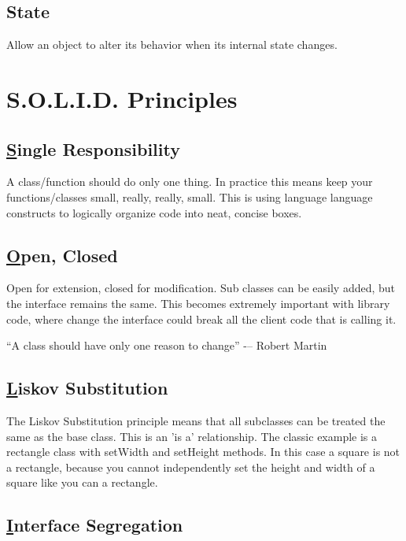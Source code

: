 \documentclass{article}
\begin{document}
\subsection{State}

\begin{displayquote}
Allow an object to alter its behavior when its internal state changes. \cite{guru}
\end{displayquote}

\section{S.O.L.I.D. Principles}

\subsection{\underline{S}ingle Responsibility}

A class/function should do only one thing. In practice this means keep your functions/classes
small, really, really, small. This is using language language constructs to logically organize
code into neat, concise boxes.

\subsection{\underline{O}pen, Closed}

Open for extension, closed for modification. Sub classes can be easily added, but the interface
remains the same. This becomes extremely important with library code, where change the interface
could break all the client code that is calling it.

\begin{displayquote}
``A class should have only one reason to change'' -– Robert Martin
\end{displayquote}

\subsection{\underline{L}iskov Substitution}

The Liskov Substitution principle means that all subclasses can be treated the same as the base class.
This is an 'is a' relationship. The classic example is a rectangle class with setWidth and setHeight methods.
In this case a square is not a rectangle, because you cannot independently set the height and width of a square
like you can a rectangle.

\subsection{\underline{I}nterface Segregation}
\end{document}
